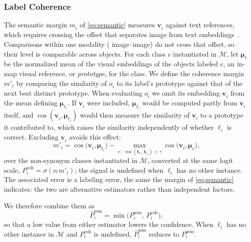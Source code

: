 \subsubsection{Label Coherence}
The semantic margin $m^{}_i$ of \cref{eq:semantic} measures $\mathbf{v}^{}_i$ against text references, which requires crossing the offset that separates image from text embeddings~\cite{liang2022mind}. Comparisons within one modality (\eg{} image--image) do not cross that offset, so their level is comparable across objects. For each class $c$ instantiated in $\mathcal{M}$, let $\boldsymbol{\mu}^{}_c$ be the normalized mean of the visual embeddings of the objects labeled $c$, an in-map visual reference, or \emph{prototype}, for the class. We define the coherence margin $m'_i$ by comparing the similarity of $o^{}_i$ to its label's prototype against that of the next best distinct prototype. When evaluating $o^{}_i$ we omit its embedding $\mathbf{v}^{}_i$ from the mean defining $\boldsymbol{\mu}^{}_{\ell_i}$. If $\mathbf{v}^{}_i$ were included, $\boldsymbol{\mu}^{}_{\ell_i}$ would be computed partly from $\mathbf{v}^{}_i$ itself, and $\cos(\mathbf{v}^{}_i, \boldsymbol{\mu}^{}_{\ell_i})$ would then measure the similarity of $\mathbf{v}^{}_i$ to a prototype it contributed to, which raises the similarity independently of whether $\ell^{}_i$ is correct. Excluding $\mathbf{v}^{}_i$ avoids this effect:
\begin{equation}
    m'_i = \cos\bigl(\mathbf{v}^{}_i, \boldsymbol{\mu}^{}_{\ell_i}\bigr) - \max_{c\, :\, \cos(\mathbf{t}^{}_c,\, \mathbf{t}^{}_{\ell_i}) < \tau} \cos\bigl(\mathbf{v}^{}_i, \boldsymbol{\mu}^{}_c\bigr),
\end{equation}
over the non-synonym classes instantiated in $\mathcal{M}$, converted at the same logit scale, $P^{\mathrm{coh}}_i = \sigma(\alpha\, m'_i)$; the signal is undefined when $\ell^{}_i$ has no other instance. The associated error is a labeling error, the same the margin of \cref{eq:semantic} indicates: the two are alternative estimators rather than independent factors.

We therefore combine them as
\begin{equation}
    \bar{P}^{\mathrm{sem}}_i = \min\bigl(P^{\mathrm{sem}}_i,\, P^{\mathrm{coh}}_i\bigr),
    \label{eq:coherence}
\end{equation}
so that a low value from either estimator lowers the confidence.
When $\ell^{}_i$ has no other instance in $\mathcal{M}$ and $P^{\mathrm{coh}}_i$ is undefined, $\bar{P}^{\mathrm{sem}}_i$ reduces to $P^{\mathrm{sem}}_i$.

